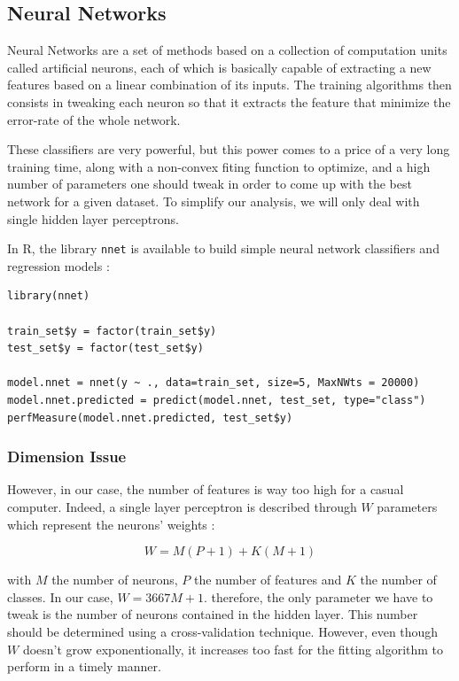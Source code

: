 \documentclass[]{report}
\begin{document}
\pagebreak

\subsection{Neural Networks}

Neural Networks are a set of methods based on a collection of computation units called artificial neurons, each of which is basically capable of extracting a new features based on a linear combination of its inputs. The training algorithms then consists in tweaking each neuron so that it extracts the feature that minimize the error-rate of the whole network.

These classifiers are very powerful, but this power comes to a price of a very long training time, along with a non-convex fiting function to optimize, and a high number of parameters one should tweak in order to come up with the best network for a given dataset. To simplify our analysis, we will only deal with single hidden layer perceptrons. 

In R, the library \texttt{nnet} is available to build simple neural network classifiers and regression models : 
\begin{lstlisting}
library(nnet)

train_set$y = factor(train_set$y)
test_set$y = factor(test_set$y)

model.nnet = nnet(y ~ ., data=train_set, size=5, MaxNWts = 20000)
model.nnet.predicted = predict(model.nnet, test_set, type="class")
perfMeasure(model.nnet.predicted, test_set$y)
\end{lstlisting}

\subsubsection{Dimension Issue}

However, in our case, the number of features is way too high for a casual computer. Indeed, a single layer perceptron is described through $W$ parameters which represent the neurons' weights : 

$$
	W = M(P+1) + K(M+1)
$$

with $M$ the number of neurons, $P$ the number of features and $K$ the number of classes. In our case, $W = 3667M + 1$.
 therefore, the only parameter we have to tweak is the number of neurons contained in the hidden layer. This number should be determined using a cross-validation technique. However, even though $W$ doesn't grow exponentionally, it increases too fast for the fitting algorithm to perform in a timely manner. 
 
\end{document}
